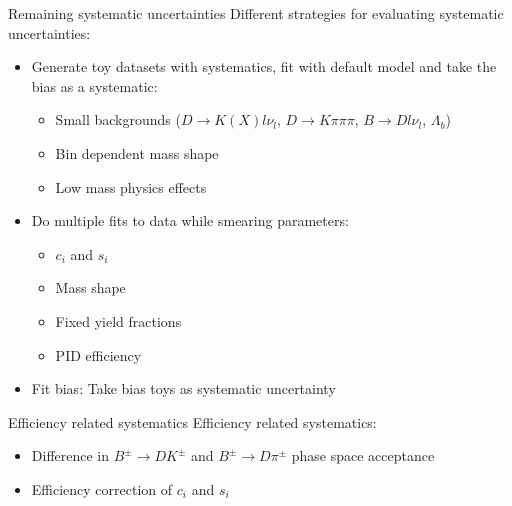 \documentclass{beamer}
\begin{document}
\begin{frame}{Remaining systematic uncertainties}
  Different strategies for evaluating systematic uncertainties:
  \vspace{0.2cm}
  \begin{itemize}
    \setlength\itemsep{1em}
    \item{Generate toy datasets with systematics, fit with default model and take the bias as a systematic:}
    \begin{itemize}
      \item{Small backgrounds ($D\to K(X)l\nu_l$, $D\to K\pi\pi\pi$, $B\to Dl\nu_l$, $\Lambda_b$)}
      \item{Bin dependent mass shape}
      \item{Low mass physics effects}
    \end{itemize}
    \item{Do multiple fits to data while smearing parameters:}
    \begin{itemize}
      \item{$c_i$ and $s_i$}
      \item{Mass shape}
      \item{Fixed yield fractions}
      \item{PID efficiency}
    \end{itemize}
    \item{Fit bias: Take bias toys as systematic uncertainty}
  \end{itemize}
\end{frame}

\begin{frame}{Efficiency related systematics}
  Efficiency related systematics:
  \vspace{0.7cm}
  \begin{itemize}
    \setlength\itemsep{2em}
    \item{Difference in $B^\pm\to DK^\pm$ and $B^\pm\to D\pi^\pm$ phase space acceptance}
    \item{Efficiency correction of $c_i$ and $s_i$}
  \end{itemize}
\end{frame}
\end{document}
